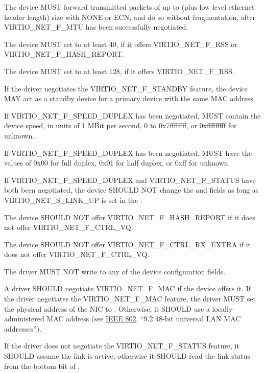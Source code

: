 The device MUST forward transmitted packets of up to  (plus low
level ethernet header length) size with  NONE or ECN, and do
so without fragmentation, after VIRTIO_NET_F_MTU has been successfully
negotiated.

The device MUST set  to at least 40, if it offers
VIRTIO_NET_F_RSS or VIRTIO_NET_F_HASH_REPORT.

The device MUST set  to at least 128, if it offers
VIRTIO_NET_F_RSS.

If the driver negotiates the VIRTIO_NET_F_STANDBY feature, the device MAY act
as a standby device for a primary device with the same MAC address.

If VIRTIO_NET_F_SPEED_DUPLEX has been negotiated, 
MUST contain the device speed, in units of 1 MBit per second, 0 to
0x7ffffffff, or 0xfffffffff for unknown.

If VIRTIO_NET_F_SPEED_DUPLEX has been negotiated, 
MUST have the values of 0x00 for full duplex, 0x01 for half
duplex, or 0xff for unknown.

If VIRTIO_NET_F_SPEED_DUPLEX and VIRTIO_NET_F_STATUS have both
been negotiated, the device SHOULD NOT change the  and
 fields as long as VIRTIO_NET_S_LINK_UP is set in
the .

The device SHOULD NOT offer VIRTIO_NET_F_HASH_REPORT if it
does not offer VIRTIO_NET_F_CTRL_VQ.

The device SHOULD NOT offer VIRTIO_NET_F_CTRL_RX_EXTRA if it
does not offer VIRTIO_NET_F_CTRL_VQ.


The driver MUST NOT write to any of the device configuration fields.

A driver SHOULD negotiate VIRTIO_NET_F_MAC if the device offers it.
If the driver negotiates the VIRTIO_NET_F_MAC feature, the driver MUST set
the physical address of the NIC to .  Otherwise, it SHOULD
use a locally-administered MAC address (see \hyperref[intro:IEEE 802]{IEEE 802},
``9.2 48-bit universal LAN MAC addresses'').

If the driver does not negotiate the VIRTIO_NET_F_STATUS feature, it SHOULD
assume the link is active, otherwise it SHOULD read the link status from
the bottom bit of .

